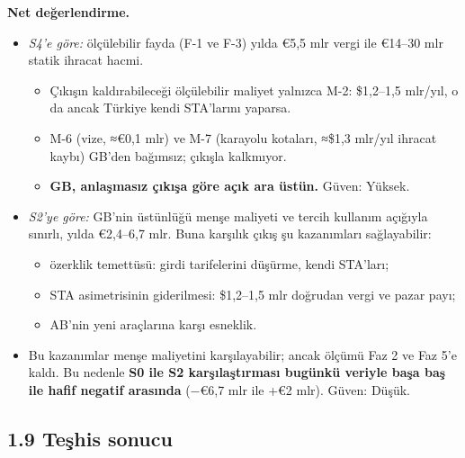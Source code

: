 \endgroup

\textbf{Net değerlendirme.}

\begin{itemize}
\tightlist
\item
  \emph{S4'e göre:} ölçülebilir fayda (F-1 ve F-3) yılda €5,5 mlr vergi ile €14--30 mlr statik ihracat hacmi.

  \begin{itemize}
  \tightlist
  \item
    Çıkışın kaldırabileceği ölçülebilir maliyet yalnızca M-2: \$1,2--1,5 mlr/yıl, o da ancak Türkiye kendi STA'larını yaparsa.
  \item
    M-6 (vize, ≈€0,1 mlr) ve M-7 (karayolu kotaları, ≈\$1,3 mlr/yıl ihracat kaybı) GB'den bağımsız; çıkışla kalkmıyor.
  \item
    \textbf{GB, anlaşmasız çıkışa göre açık ara üstün.} \etiketT{} Güven: Yüksek.
  \end{itemize}
\item
  \emph{S2'ye göre:} GB'nin üstünlüğü menşe maliyeti ve tercih kullanım açığıyla sınırlı, yılda €2,4--6,7 mlr. Buna karşılık çıkış şu kazanımları sağlayabilir:

  \begin{itemize}
  \tightlist
  \item
    özerklik temettüsü: girdi tarifelerini düşürme, kendi STA'ları;
  \item
    STA asimetrisinin giderilmesi: \$1,2--1,5 mlr doğrudan vergi ve pazar payı;
  \item
    AB'nin yeni araçlarına karşı esneklik.
  \end{itemize}
\item
  Bu kazanımlar menşe maliyetini karşılayabilir; ancak ölçümü Faz 2 ve Faz 5'e kaldı. Bu nedenle \textbf{S0 ile S2 karşılaştırması bugünkü veriyle başa baş ile hafif negatif arasında} (−€6,7 mlr ile +€2 mlr). \etiketT{} Güven: Düşük.
\end{itemize}

\hypertarget{01_teshis-19-teux15fhis-sonucu}{%
\subsection{1.9 Teşhis sonucu}\label{01_teshis-19-teux15fhis-sonucu}}


